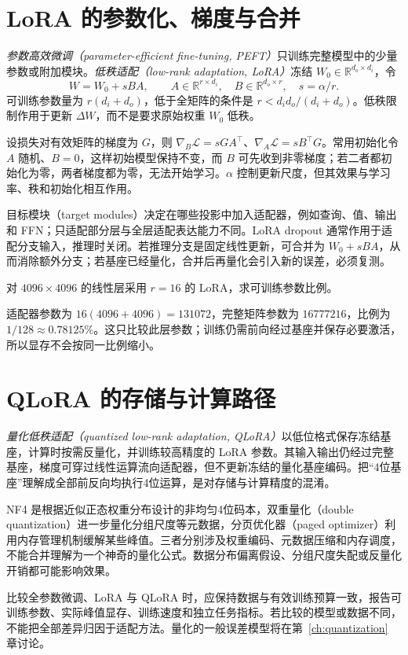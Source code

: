 \section{LoRA 的参数化、梯度与合并}

\emph{参数高效微调（parameter-efficient fine-tuning, PEFT）}只训练完整模型中的少量参数或附加模块。\emph{低秩适配（low-rank adaptation, LoRA）}冻结 $W_0\in\mathbb R^{d_o\times d_i}$，令
\begin{equation}
W=W_0+sBA,\qquad A\in\mathbb R^{r\times d_i},\quad
B\in\mathbb R^{d_o\times r},\quad s=\alpha/r.
\label{eq:lora}
\end{equation}
可训练参数量为 $r(d_i+d_o)$，低于全矩阵的条件是 $r<d_id_o/(d_i+d_o)$。低秩限制作用于更新 $\Delta W$，而不是要求原始权重 $W_0$ 低秩\cite{lora}。

设损失对有效矩阵的梯度为 $G$，则 $\nabla_B\mathcal L=sGA^\top$、$\nabla_A\mathcal L=sB^\top G$。常用初始化令 $A$ 随机、$B=0$，这样初始模型保持不变，而 $B$ 可先收到非零梯度；若二者都初始化为零，两者梯度都为零，无法开始学习。$\alpha$ 控制更新尺度，但其效果与学习率、秩和初始化相互作用。

目标模块（target modules）决定在哪些投影中加入适配器，例如查询、值、输出和 FFN；只适配部分层与全层适配表达能力不同。LoRA dropout 通常作用于适配分支输入，推理时关闭。若推理分支是固定线性更新，可合并为 $W_0+sBA$，从而消除额外分支；若基座已经量化，合并后再量化会引入新的误差，必须复测。

\begin{example}
对 $4096\times4096$ 的线性层采用 $r=16$ 的 LoRA，求可训练参数比例。
\end{example}
\begin{solve}
适配器参数为 $16(4096+4096)=131072$，完整矩阵参数为 $16777216$，比例为 $1/128\approx0.78125\%$。这只比较此层参数；训练仍需前向经过基座并保存必要激活，所以显存不会按同一比例缩小。
\end{solve}

\section{QLoRA 的存储与计算路径}

\emph{量化低秩适配（quantized low-rank adaptation, QLoRA）}以低位格式保存冻结基座，计算时按需反量化，并训练较高精度的 LoRA 参数\cite{qlora}。其输入输出仍经过完整基座，梯度可穿过线性运算流向适配器，但不更新冻结的量化基座编码。把“4位基座”理解成全部前反向均执行4位运算，是对存储与计算精度的混淆。

NF4 是根据近似正态权重分布设计的非均匀4位码本，双重量化（double quantization）进一步量化分组尺度等元数据，分页优化器（paged optimizer）利用内存管理机制缓解某些峰值。三者分别涉及权重编码、元数据压缩和内存调度，不能合并理解为一个神奇的量化公式。数据分布偏离假设、分组尺度失配或反量化开销都可能影响效果。

比较全参数微调、LoRA 与 QLoRA 时，应保持数据与有效训练预算一致，报告可训练参数、实际峰值显存、训练速度和独立任务指标。若比较的模型或数据不同，不能把全部差异归因于适配方法。量化的一般误差模型将在第~\ref{ch:quantization} 章讨论。

